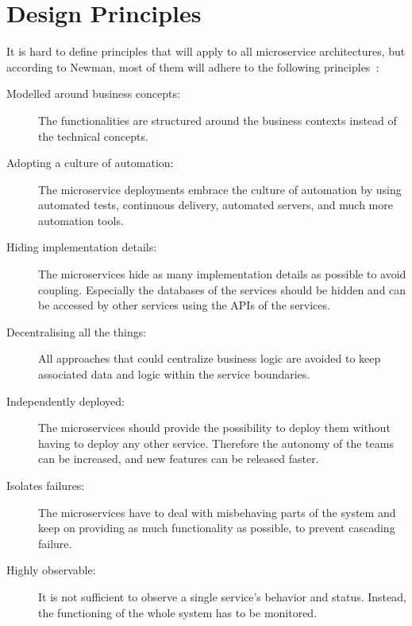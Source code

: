 \section{Design Principles}
It is hard to define principles that will apply to all microservice architectures, but according to Newman, most of them will adhere to the following principles~\cite{newman2021building}: 
\begin{description}
    \item[Modelled around business concepts:] The functionalities are structured around the business contexts instead of the technical concepts.
    \item[Adopting a culture of automation:] The microservice deployments embrace the culture of automation by using automated tests, continuous delivery, automated servers, and much more automation tools.
    \item[Hiding implementation details:] The microservices hide as many implementation details as possible to avoid coupling.
		Especially the databases of the services should be hidden and can be accessed by other services using the APIs of the services.
    \item[Decentralising all the things:] All approaches that could centralize business logic are avoided to keep associated data and logic within the service boundaries.
    \item[Independently deployed:] The microservices should provide the possibility to deploy them without having to deploy any other service.
		Therefore the autonomy of the teams can be increased, and new features can be released faster.
    \item[Isolates failures:] The microservices have to deal with misbehaving parts of the system and keep on providing as much functionality as possible, to prevent cascading failure.
    \item[Highly observable:] It is not sufficient to observe a single service's behavior and status.
		Instead, the functioning of the whole system has to be monitored.
\end{description}

